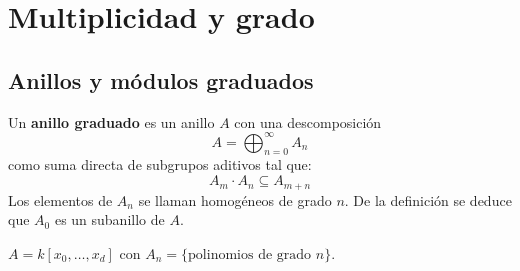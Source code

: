 \documentclass[ACGA.tex]{subfiles}
\begin{document}
%
%
%
%
%
%
%
%
%
%
%
%
%


\chapter{Multiplicidad y grado}

\section{Anillos y módulos graduados}
\begin{defi}
Un \textbf{anillo graduado} es un anillo $A$ con una descomposición 
\[ A = \bigoplus_{n=0}^{∞} A_n \]
como suma directa de subgrupos aditivos tal que:
\[ A_m \cdot A_n \subseteq A_{m+n} \]
Los elementos de $A_n$ se llaman homogéneos de grado $n$. De la definición se deduce que $A_0$ es un subanillo de $A$.
\end{defi}

\begin{ej}
$A = k[x_0,\dots,x_d]$ con $A_n = \{\text{polinomios de grado }n\}$.
\end{ej}
\end{document}
